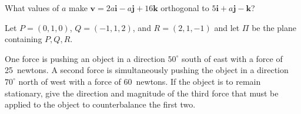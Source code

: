 \documentclass[12pt,answers,addpoints]{exam}
\begin{document}
\begin{questions}

\question[12] What values of $a$ make
$\mathbold{v}=2a\mathbold{i}-a\mathbold{j}+16\mathbold{k}$
orthogonal to $5\mathbold{i}+a\mathbold{j}-\mathbold{k}$?

\question[20]
Let $P=\left(0,1,0\right)$, $Q=\left(-1,1,2\right)$,
and $R=\left(2,1,-1\right)$ and let $\Pi$ be the plane
containing $P,Q,R$.

\question[20] One force is pushing an object in a direction
$50^\circ$ south of east with a force of 25~newtons.
A second force is simultaneously pushing the object
in a direction $70^\circ$ north of west with a force of
60~newtons. If the object is to remain stationary,
give the direction and magnitude of the third force that must
be applied to the object to counterbalance
the first two.


\end{questions}
\end{document}
